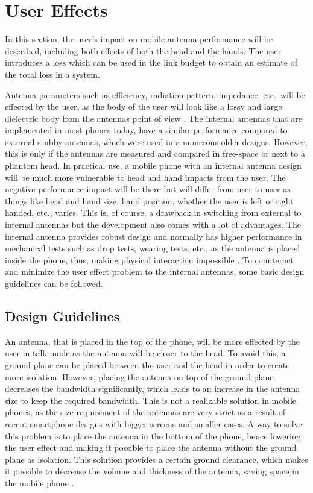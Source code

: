 \section{User Effects}
\label{se:user_effects}
\begin{aautop}
    In this section, the user's impact on mobile antenna performance will be described, including both effects of both the head and the hands. The user introduces a loss which can be used in the link budget to obtain an estimate of the total loss in a system.
\end{aautop}

Antenna parameters such as efficiency, radiation pattern, impedance, etc.\ will be effected by the user, as the body of the user will look like a lossy and large dielectric body from the antennas point of view \cite{balanis2008modern}.
The internal antennas that are implemented in most phones today, have a similar performance compared to external stubby antennas, which were used in a numerous older designs. However, this is only if the antennas are measured and compared in free-space or next to a phantom head. In practical use, a mobile phone with an internal antenna design will be much more vulnerable to head and hand impacts from the user. 
The negative performance impact will be there but will differ from user to user as things like head and hand size, hand position, whether the user is left or right handed, etc., varies. This is, of course, a drawback in switching from external to internal antennas but the development also comes with a lot of advantages. The internal antenna provides robust design and normally has higher performance in mechanical tests such as drop tests, wearing tests, etc., as the antenna is placed inside the phone, thus, making physical interaction impossible \cite{balanis2008modern}. 
To counteract and minimize the user effect problem to the internal antennas, some basic design guidelines can be followed.

\subsection{Design Guidelines}
An antenna, that is placed in the top of the phone, will be more effected by the user in talk mode as the antenna will be closer to the head. To avoid this, a ground plane can be placed between the user and the head in order to create more isolation. However, placing the antenna on top of the ground plane decreases the bandwidth significantly, which leads to an increase in the antenna size to keep the required bandwidth. This is not a realizable solution in mobile phones, as the size requirement of the antennas are very strict as a result of recent smartphone designs with bigger screens and smaller cases. A way to solve this problem is to place the antenna in the bottom of the phone, hence lowering the user effect and making it possible to place the antenna without the ground plane as isolation. This solution provides a certain ground clearance, which makes it possible to decrease the volume and thickness of the antenna, saving space in the mobile phone \cite{balanis2008modern}. 

